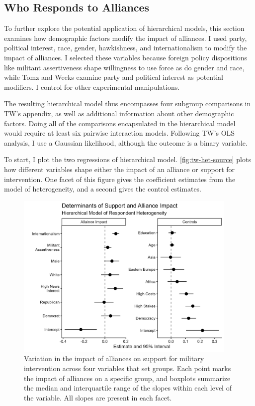 \documentclass[12pt]{article}
\begin{document}
\subsection{Who Responds to Alliances}


To further explore the potential application of hierarchical models, this section examines how demographic factors modify the impact of alliances.
I used party, political interest, race, gender, hawkishness, and internationalism to modify the impact of alliances.
I selected these variables because foreign policy dispositions like militant assertiveness shape willingness to use force \citep{Kertzeretal2014} as do gender \citep{Barnhartetal2020} and race, while Tomz and Weeks examine party and political interest as potential modifiers. 
I control for other experimental manipulations.


The resulting hierarchical model thus encompasses four subgroup comparisons in TW's appendix, as well as additional information about other demographic factors. 
Doing all of the comparisons encapsulated in the hierarchical model would require at least six pairwise interaction models. 
Following TW's OLS analysis, I use a Gaussian likelihood, although the outcome is a binary variable. 


To start, I plot the two regressions of hierarchical model. 
\autoref{fig:tw-het-source} plots how different variables shape either the impact of an alliance or support for intervention. 
One facet of this figure gives the coefficient estimates from the model of heterogeneity, and a second gives the control estimates. 



\begin{figure}[htpb]
	\centering
		\includegraphics[width=0.95\textwidth]{../figures/tw-treat-het-source.png}
	\caption{Variation in the impact of alliances on support for military intervention across four variables that set groups. Each point marks the impact of alliances on a specific group, and boxplots summarize the median and interquartile range of the slopes within each level of the variable. All slopes are present in each facet.}
	\label{fig:tw-het-source}
\end{figure}
\end{document}
